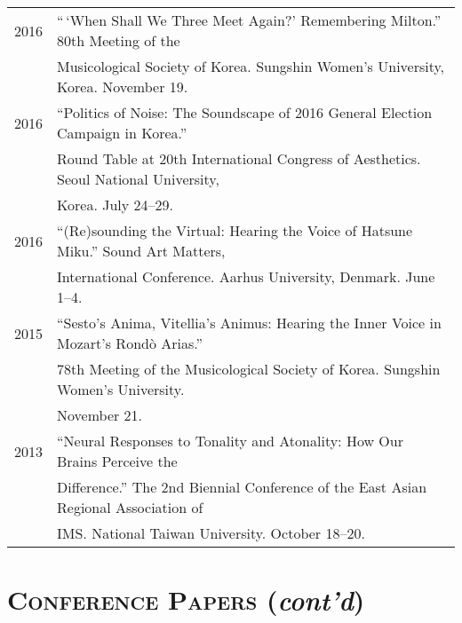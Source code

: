 \documentclass[letter,11pt]{article}
\begin{document}
\begin{tabular}{p{2.5cm} p{12.5cm}}
    2016 & “\,‘When Shall We Three Meet Again?’ Remembering Milton.” 80th
    Meeting of the\\
    & Musicological Society of Korea. Sungshin Women’s University, Korea.
    November 19.\\[2mm]

    2016 & “Politics of Noise: The Soundscape of 2016 General Election Campaign
    in Korea.”\\
    & Round Table at 20th International Congress of Aesthetics. Seoul National
    University,\\
    & Korea. July 24--29.\\[2mm]
  
    2016 & “(Re)sounding the Virtual: Hearing the Voice of Hatsune Miku.” Sound
    Art Matters,\\
    & International Conference. Aarhus University, Denmark. June 1--4.\\[2mm]
  
    2015 & “Sesto’s Anima, Vitellia’s Animus: Hearing the Inner Voice in
    Mozart’s Rond\`{o} Arias.”\\
    & 78th Meeting of the Musicological Society of Korea. Sungshin Women’s
    University.\\
    & November 21.\\[2mm]
  
    2013 & “Neural Responses to Tonality and Atonality: How Our Brains Perceive
    the\\
    & Difference.” The 2nd Biennial Conference of the East Asian Regional
    Association of\\
    & IMS. National Taiwan University. October 18–20.
    
  \end{tabular}
  
  \section*{\textsc{Conference Papers} (\textit{cont'd})}
  
\end{document}
